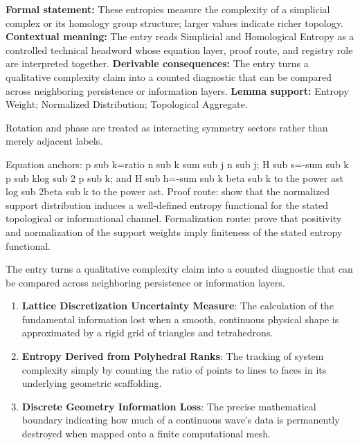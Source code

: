 \begingroup\footnotesize\setlength{\emergencystretch}{3em}\sloppy
\textbf{Formal statement:} These entropies measure the complexity of a simplicial complex or its homology group structure; larger values indicate richer topology. \textbf{Contextual meaning:} The entry reads Simplicial and Homological Entropy as a controlled technical headword whose equation layer, proof route, and registry role are interpreted together. \textbf{Derivable consequences:} The entry turns a qualitative complexity claim into a counted diagnostic that can be compared across neighboring persistence or information layers. \textbf{Lemma support:} Entropy Weight; Normalized Distribution; Topological Aggregate.\par
\endgroup

Rotation and phase are treated as interacting symmetry sectors rather than merely adjacent labels.

Equation anchors: p sub k=ratio n sub k sum sub j n sub j; H sub s=-sum sub k p sub klog sub 2 p sub k; and H sub h=-sum sub k beta sub k to the power ast log sub 2beta sub k to the power ast. Proof route: show that the normalized support distribution induces a well-defined entropy functional for the stated topological or informational channel. Formalization route: prove that positivity and normalization of the support weights imply finiteness of the stated entropy functional.

The entry turns a qualitative complexity claim into a counted diagnostic that can be compared across neighboring persistence or information layers.
\endgroup

\begin{enumerate}[leftmargin=1.6em,itemsep=6pt,topsep=4pt]
\item \textbf{Lattice Discretization Uncertainty Measure}: The calculation of the fundamental information lost when a smooth, continuous physical shape is approximated by a rigid grid of triangles and tetrahedrons.
\item \textbf{Entropy Derived from Polyhedral Ranks}: The tracking of system complexity simply by counting the ratio of points to lines to faces in its underlying geometric scaffolding.
\item \textbf{Discrete Geometry Information Loss}: The precise mathematical boundary indicating how much of a continuous wave's data is permanently destroyed when mapped onto a finite computational mesh.
\end{enumerate}

